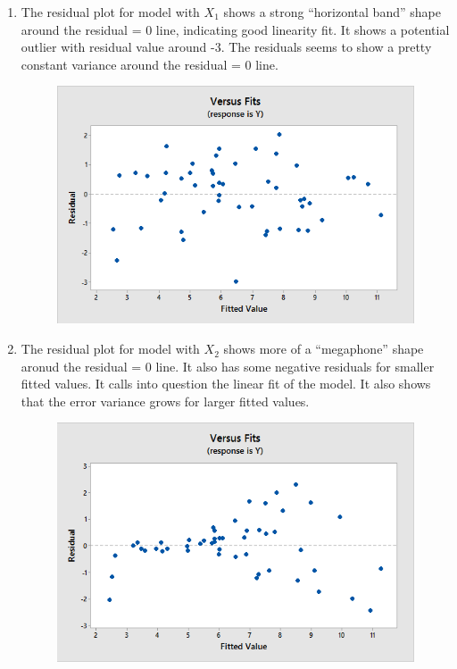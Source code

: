 \documentclass{article}
\begin{document}
\newpage
\begin{enumerate}
\def\labelenumi{\alph{enumi})}
\setcounter{enumi}{1}
\item
  The residual plot for model with \(X_1\) shows a strong ``horizontal
  band'' shape around the residual = 0 line, indicating good linearity
  fit. It shows a potential outlier with residual value around -3. The
  residuals seems to show a pretty constant variance around the residual
  = 0 line.
  
  \begin{figure}[h!]
 \centering
 \includegraphics[scale=.3]{./images/plot-residuals-vs-fit_y-vs-x1.png}
\end{figure}

\item
  The residual plot for model with \(X_2\) shows more of a ``megaphone''
  shape aronud the residual = 0 line. It also has some negative
  residuals for smaller fitted values. It calls into question the linear
  fit of the model. It also shows that the error variance grows for
  larger fitted values.
  
  \begin{figure}[h!]
 \centering
 \includegraphics[scale=.3]{./images/plot-residuals-vs-fit_y-vs-x2.png}
\end{figure}


\end{enumerate}
\end{document}
